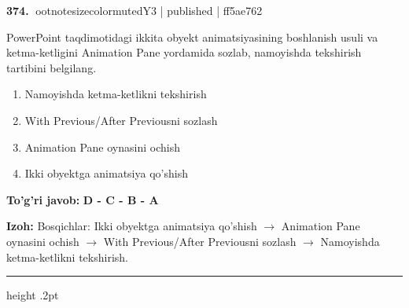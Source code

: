 \documentclass[10pt,a4paper]{article}
\begin{document}
\textbf{\color{ink}374.} {ootnotesizecolor{muted}Y3 | published | ff5ae762}
\par
PowerPoint taqdimotidagi ikkita obyekt animatsiyasining boshlanish usuli va ketma-ketligini Animation Pane yordamida sozlab, namoyishda tekshirish tartibini belgilang.
\begin{enumerate}[label=\Alph*),leftmargin=9mm]
\item Namoyishda ketma-ketlikni tekshirish
\item With Previous/After Previousni sozlash
\item Animation Pane oynasini ochish
\item Ikki obyektga animatsiya qo'shish
\end{enumerate}
\begin{tcolorbox}[enhanced,breakable,colback=teal!4,colframe=teal!55!black,boxrule=0.45pt,arc=1.2mm,left=2.8mm,right=2.8mm,top=2mm,bottom=2mm]
\textbf{\color{teal}To'g'ri javob:} \textbf{D - C - B - A}
\par\smallskip
\textbf{Izoh:} Bosqichlar: Ikki obyektga animatsiya qo'shish \ensuremath{\rightarrow} Animation Pane oynasini ochish \ensuremath{\rightarrow} With Previous/After Previousni sozlash \ensuremath{\rightarrow} Namoyishda ketma-ketlikni tekshirish.
\end{tcolorbox}
\vspace{2mm}\hrule height .2pt\vspace{2mm}
\end{document}
